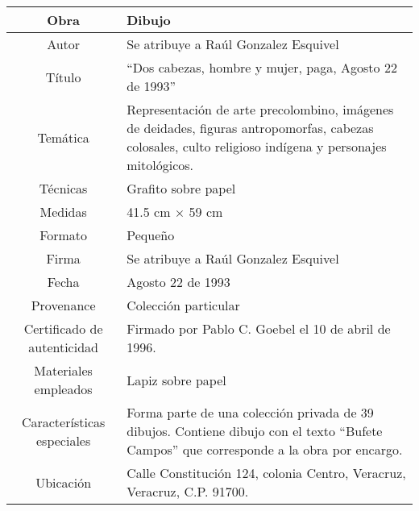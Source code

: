 \documentclass[10pt,letter]{report}
\begin{document}
\begin{table}[H]
\centering
\begin{tabular}{|c|m{}|}
\hline
Obra& Dibujo	\\
\hline
Autor & Se atribuye a Ra\'ul Gonzalez Esquivel\\
\hline
T\'itulo & ``Dos cabezas, hombre y mujer, paga, Agosto 22 de 1993''\\
\hline
Tem\'atica & Representaci\'on de arte precolombino, im\'agenes de deidades, figuras antropomorfas, cabezas colosales, culto religioso ind\'igena y personajes mitol\'ogicos.\\
\hline
T\'ecnicas &Grafito sobre papel \\
\hline
Medidas & 41.5 cm $\times$ 59 cm \\
\hline
 Formato & Peque\~no \\
 \hline
 Firma & Se atribuye a Ra\'ul Gonzalez Esquivel\\ 
 \hline
  Fecha & Agosto 22 de 1993\\
 \hline
 Provenance & Colecci\'on particular\\
 \hline
 Certificado de autenticidad& Firmado por Pablo C. Goebel el 10 de abril de 1996.  \\
 \hline 
  Materiales empleados & Lapiz sobre papel\\
 \hline
 Caracter\'isticas especiales & Forma parte de una colecci\'on privada de 39 dibujos. 
Contiene dibujo con el texto ``Bufete Campos'' que corresponde a la obra por encargo. \\
\hline 
Ubicaci\'on & Calle Constituci\'on 124, colonia Centro, Veracruz, Veracruz, C.P. 91700.\\
\hline

\end{tabular}
\end{table}
\end{document}
